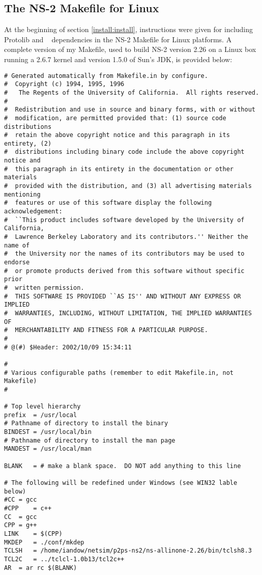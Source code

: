 \normalsize

\subsection{The NS-2 Makefile for Linux}
\label{install:p2ps-ns2-build-linux}

At the beginning of section \ref{install:install}, instructions were given for
including Protolib and \agentj~ dependencies in the NS-2 Makefile for Linux
platforms.  A complete version of my Makefile, used to build NS-2 version 2.26
on a Linux box running a 2.6.7 kernel and version 1.5.0 of Sun's JDK, is
provided below:

\footnotesize
\begin{verbatim}
# Generated automatically from Makefile.in by configure.
#  Copyright (c) 1994, 1995, 1996
# 	The Regents of the University of California.  All rights reserved.
#
#  Redistribution and use in source and binary forms, with or without
#  modification, are permitted provided that: (1) source code distributions
#  retain the above copyright notice and this paragraph in its entirety, (2)
#  distributions including binary code include the above copyright notice and
#  this paragraph in its entirety in the documentation or other materials
#  provided with the distribution, and (3) all advertising materials mentioning
#  features or use of this software display the following acknowledgement:
#  ``This product includes software developed by the University of California,
#  Lawrence Berkeley Laboratory and its contributors.'' Neither the name of
#  the University nor the names of its contributors may be used to endorse
#  or promote products derived from this software without specific prior
#  written permission.
#  THIS SOFTWARE IS PROVIDED ``AS IS'' AND WITHOUT ANY EXPRESS OR IMPLIED
#  WARRANTIES, INCLUDING, WITHOUT LIMITATION, THE IMPLIED WARRANTIES OF
#  MERCHANTABILITY AND FITNESS FOR A PARTICULAR PURPOSE.
#
# @(#) $Header: 2002/10/09 15:34:11

#
# Various configurable paths (remember to edit Makefile.in, not Makefile)
#

# Top level hierarchy
prefix	= /usr/local
# Pathname of directory to install the binary
BINDEST	= /usr/local/bin
# Pathname of directory to install the man page
MANDEST	= /usr/local/man

BLANK	= # make a blank space.  DO NOT add anything to this line

# The following will be redefined under Windows (see WIN32 lable below)
#CC	= gcc
#CPP	= c++
CC	= gcc
CPP	= g++
LINK	= $(CPP)
MKDEP	= ./conf/mkdep
TCLSH	= /home/iandow/netsim/p2ps-ns2/ns-allinone-2.26/bin/tclsh8.3
TCL2C	= ../tclcl-1.0b13/tcl2c++
AR	= ar rc $(BLANK)


\end{verbatim}
